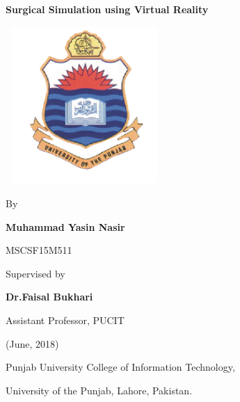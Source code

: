 


\begin{center}
\Large{\textbf{Surgical Simulation using Virtual Reality}}

\end{center}
\bigskip

\begin{center}
    

\includegraphics[width=6cm, height=6cm]{a.PNG}
\end{center}

\begin{center}
    

    By
    
\bigskip    
\large{\textbf{Muhammad Yasin Nasir}}

\bigskip
\large{MSCSF15M511}

\bigskip
Supervised by

\bigskip
\large{\textbf{Dr.Faisal Bukhari}}


\bigskip
Assistant Professor, PUCIT

\bigskip
(June, 2018)

\bigskip
Punjab University College of Information Technology,

\bigskip
University of the Punjab, Lahore, Pakistan. 

\end{center}

